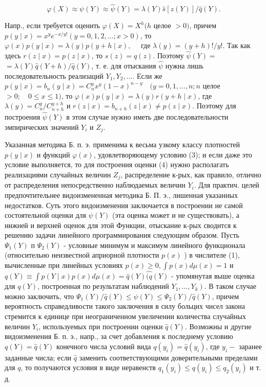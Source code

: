 \documentclass[10pt]{article}
\begin{document}
\[

\varphi(X) \approx \psi(Y) \approx \hat{\psi}(Y)=\lambda(Y) \hat{s}[z(Y)] / \hat{q}(Y) .

\]



Напр., если требуется оценить $\varphi(X)=X^{h}(h$ целое $>0)$, причем $p(y \mid x)=x^{y} e^{-x / y !}(y=0,1,2, \ldots ; x>0)$, то $\varphi(x) p(y \mid x)=\lambda(y) p(y+h \mid x), \quad$ где $\lambda(y)=(y+h) ! / y !$. Так как здесь $r(z \mid x)=p(z \mid x)$, то $s(z)=q(z)$. Поэтому $\hat{\psi}(Y)=$ $=\lambda(Y) \hat{q}(Y+h) / \hat{q}(Y)$, т. е. для отыскания $\hat{\psi}$ нужна лишь последовательность реализаций $Y_{1}, Y_{2}, \ldots$. Если же $p(y \mid x)=b_{n}(y \mid x)=C_{n}^{y} x^{y}(1-x)^{n-y} \quad(y=0,1, \ldots, n ; n$ целое $>0 ; \quad 0 \leqslant x \leqslant 1)$, то $\varphi(x) p(y \mid x)=\lambda(y) r(y+h \mid x)$, где $\lambda(y)=C_{n}^{y} / C_{n+h}^{y+h}$ и $r(z \mid x)=b_{n+h}(z \mid x) \neq p(z \mid x)$. Поэтому для построения $\hat{\psi}(Y)$ в этом случае нужно иметь две последовательности эмпирических значений $Y_{i}$ и $Z_{j}$.



Указанная методика Б. п. э. применима к весьма узкому классу плотностей $p(y \mid x)$ и функций $\varphi(x)$, удовлетворяющему условию (3); и если даже это условие выполняется, то для построения оценки (4) нужно располагать реализациями случайных величин $Z_{j}$, распределение к-рых, как правило, отлично от распределения непосредственно наблюдаемых величин $Y_{i}$. Для практич. целей предпочтительнее видоизмененная методика Б. П. э., лишенная указанных недостатков. Суть этого видоизменения заключается в построении не самой состоятельной оценки для $\psi(Y)$ (эта оценка может и не существовать), а нижней и верхней оценок для этой Функции, отыскание к-рых сводится к решению задачи линейного программирования следующим образом. Пусть $\Psi_{1}(Y)$ п $\Psi_{2}(Y)$ - условные минимум и максимум линейного функционала (относительно неизвестной априорной плотности $p(x)$ ) в числителе (1), вычисленные при линейных условиях $p(x) \geqslant 0, \int p(x) d \mu(x)=1$ и $q(Y) \equiv \int p(Y \mid x) p(x) d \mu(x)=\hat{q}(Y) \hat{(q}(Y)$ - упомянутая выше оценка для $q(Y)$, построенная по результатам наблюдений $\left.Y_{1}, \ldots, Y_{k}\right)$. В таком случае можно заключить, что $\Psi_{1}(Y) / \hat{q}(Y) \leqslant \psi(Y) \leqslant \Psi_{2}(Y) / \hat{q}(Y)$, причем вероятность справедливости такого заключения в силу больцих чисел закона стремится к единице при неограниченном увеличении количества случайных величин $Y_{i}$, используемых при построении оценки $\widehat{q}(Y)$. Возможны и другие видоизменения Б. п. э., напр., за счет добавления к последнему условию $q(Y)=\hat{q}(Y)$ конечного числа условий вида $q\left(y_{i}\right)=\hat{q}\left(y_{i}\right)$, где $y_{i}-$ заранее заданные числа; если $\hat{q}$ заменить соответствующими доверительными пределами для $q$, то получаются условия в виде неравенств $q_{1}\left(y_{i}\right) \leqslant q\left(y_{i}\right) \leqslant q_{2}\left(y_{i}\right)$ и т. д.
\end{document}
